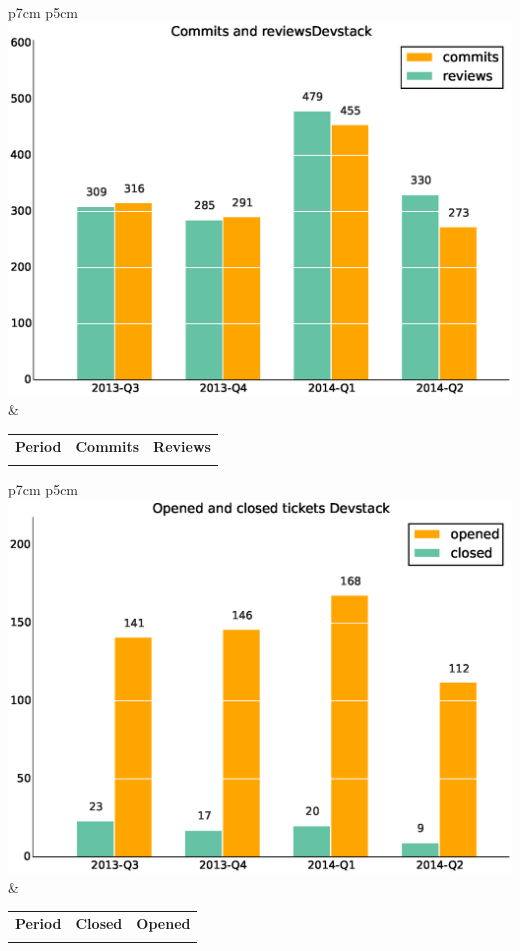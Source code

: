 \documentclass[a4wide,11pt]{report}
\begin{document}
\begin{tabular}{p{7cm} p{5cm}}
    \vspace{0pt} 
    \includegraphics[scale=.35]{figs/commitsDevstack.eps}
    & 
    \vspace{0pt}
    \begin{tabular}{l|r|r|}%
    \bfseries Period & \bfseries Commits & \bfseries Reviews %
    \csvreader[head to column names]{data/commitsDevstack.csv}{}%
    {\\ & \commits & \submitted}
    \end{tabular}
\end{tabular}

\begin{tabular}{p{7cm} p{5cm}}
    \vspace{0pt} 
    \includegraphics[scale=.35]{figs/closedDevstack.eps}
    & 
    \vspace{0pt}
    \begin{tabular}{l|r|r|}%
\bfseries Period & \bfseries Closed & \bfseries Opened
    \csvreader[head to column names]{data/closedDevstack.csv}{}%
    {\\ & \closed & \opened}
    \end{tabular}
\end{tabular}
\end{document}

